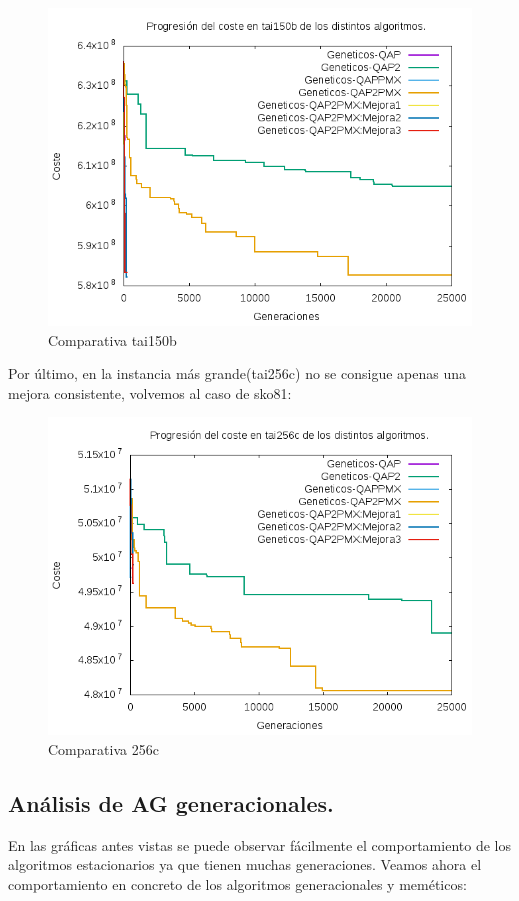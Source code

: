 \begin{figure}[H]
	\centering
	\includegraphics[width=0.7\linewidth]{graficos/comparativatai150b}
	\caption[Comparativa tai150b]{Comparativa tai150b}
	\label{fig:comparativatai150b}
\end{figure}

Por último, en la instancia más grande(tai256c) no se consigue apenas una mejora consistente, volvemos al caso de  sko81:\\

\begin{figure}[H]
\centering
\includegraphics[width=0.7\linewidth]{graficos/comparativatai256c}
\caption[]{Comparativa 256c}
\label{fig:comparativatai256c}
\end{figure}

\subsection{Análisis de AG generacionales.}

En las gráficas antes vistas se puede observar fácilmente el comportamiento de los algoritmos estacionarios ya que tienen muchas generaciones. Veamos ahora el comportamiento en concreto de los algoritmos generacionales y meméticos:

